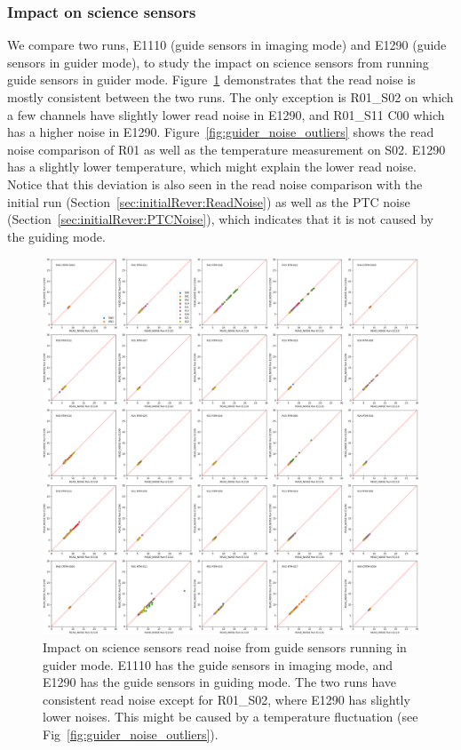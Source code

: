 \subsubsection{Impact on science sensors}\label{sec:guiderimpactonscience}
We compare two runs, E1110 (guide sensors in imaging mode) and E1290 (guide sensors in guider mode), to study the impact on science sensors from running guide sensors in guider mode. Figure~\ref{fig:guider_noise} demonstrates that the read noise is mostly consistent between the two runs. The only exception is R01\_S02 on which a few channels have slightly lower read noise in E1290, and R01\_S11 C00 which has a higher noise in E1290. Figure~\ref{fig:guider_noise_outliers} shows the read noise comparison of R01 as well as the temperature measurement on S02. E1290 has a slightly lower temperature, which might explain the lower read noise. Notice that this deviation is also seen in the read noise comparison with the initial run (Section~\ref{sec:initialRever:ReadNoise}) as well as the PTC noise (Section~\ref{sec:initialRever:PTCNoise}), which indicates that it is not caused by the guiding mode.
\begin{figure}[ht]
    \centering
    \includegraphics[width=0.95\linewidth]{figures/E1110_E1290_READ_NOISE.png}
    \caption{Impact on science sensors read noise from guide sensors running in guider mode. E1110 has the guide sensors in imaging mode, and E1290 has the guide sensors in guiding mode. The two runs have consistent read noise except for R01\_S02, where E1290 has slightly lower noises. This might be caused by a temperature fluctuation (see Fig~\ref{fig:guider_noise_outliers}).}
    \label{fig:guider_noise}
\end{figure}

